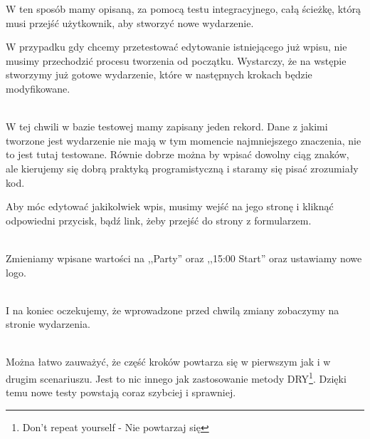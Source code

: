 W ten sposób mamy opisaną, za pomocą testu integracyjnego, całą ścieżkę, którą musi przejść użytkownik, aby stworzyć nowe wydarzenie.

W przypadku gdy chcemy przetestować edytowanie istniejącego już wpisu, nie musimy przechodzić procesu tworzenia od początku. Wystarczy, że na wstępie stworzymy już gotowe wydarzenie, które w następnych krokach będzie modyfikowane.

\begin{code}
	
\end{code}\\

W tej chwili w bazie testowej mamy zapisany jeden rekord. Dane z jakimi tworzone jest wydarzenie nie mają w tym momencie najmniejszego znaczenia, nie to jest tutaj testowane. Równie dobrze można by wpisać dowolny ciąg znaków, ale kierujemy się dobrą praktyką programistyczną i staramy się pisać zrozumiały kod.

Aby móc edytować jakikolwiek wpis, musimy wejść na jego stronę i kliknąć odpowiedni przycisk, bądź link, żeby przejść do strony z formularzem.

\begin{code}
	
\end{code}\\

Zmieniamy wpisane wartości na ,,Party'' oraz ,,15:00 Start'' oraz ustawiamy nowe logo.

\begin{code}
	
\end{code}\\

I na koniec oczekujemy, że wprowadzone przed chwilą zmiany zobaczymy na stronie wydarzenia.

\begin{code}
	
\end{code}\\

Można łatwo zauważyć, że część kroków powtarza się w pierwszym jak i w drugim scenariuszu. Jest to nic innego jak zastosowanie metody DRY\footnote{Don't repeat yourself - Nie powtarzaj się}. Dzięki temu nowe testy powstają coraz szybciej i sprawniej.

